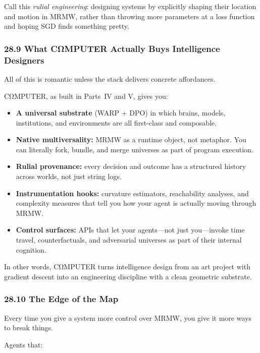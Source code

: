 Call this \emph{rulial engineering}: designing systems by explicitly shaping
their location and motion in MRMW, rather than throwing more parameters at a loss function and hoping SGD finds something pretty.

\subsubsection*{28.9  What CΩMPUTER Actually Buys Intelligence Designers}

All of this is romantic unless the stack delivers concrete affordances.

CΩMPUTER, as built in Parts~IV and V, gives you:

\begin{itemize}
  \item \textbf{A universal substrate} (WARP + DPO) in which brains, models, institutions, and environments are all first-class and composable.

  \item \textbf{Native multiversality:} MRMW as a runtime object, not metaphor. You can literally fork, bundle, and merge universes as part of program execution.

  \item \textbf{Rulial provenance:} every decision and outcome has a structured history across worlds, not just string logs.

  \item \textbf{Instrumentation hooks:} curvature estimators, reachability analyses, and complexity measures that tell you how your agent is actually moving through MRMW.

  \item \textbf{Control surfaces:} APIs that let your agents—not just you—invoke time travel, counterfactuals, and adversarial universes as part of their internal cognition.
\end{itemize}

In other words, CΩMPUTER turns intelligence design from an art project with
gradient descent into an engineering discipline with a clean geometric substrate.

\subsubsection*{28.10  The Edge of the Map}

Every time you give a system more control over MRMW, you give it more ways to break things.

Agents that:

